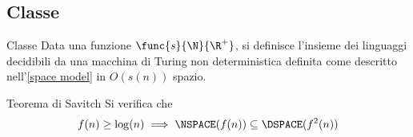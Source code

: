 \documentclass[a4paper, 12pt]{report}
\begin{document}
    \subsection{Classe \NSPACE}
    
    \begin{frameddefn}{Classe \NSPACE}
        Data una funzione $\func{s}{\N}{\R^+}$, si definisce  l'insieme dei linguaggi decidibili da una macchina di Turing non deterministica definita come descritto nell'\cref{space model} in $O(s(n))$ spazio.
    \end{frameddefn}

    \begin{framedthm}[label={savitch}]{Teorema di Savitch}
        Si verifica che $$f(n) \geq \log(n) \implies \NSPACE(f(n)) \subseteq \DSPACE(f^2(n))$$
    \end{framedthm}
\end{document}
